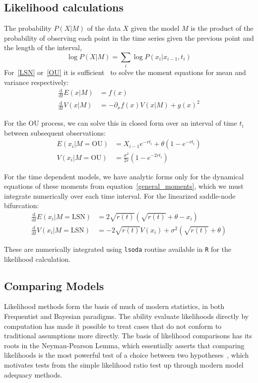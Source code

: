 \documentclass[authoryear,review,11pt]{elsarticle}
\newcommand{\ud}{\mathrm{d}}
\begin{document}
\subsection*{Likelihood calculations}
The probability $P(X|M)$ of the data $X$ given the model $M$ is the product of the probability of observing each point in the time series given the previous point and the length of the interval,  
\begin{equation}
\log P(X | M)=  \sum_i \log P(x_i | x_{i-1}, t_i)
\end{equation}
For~\eqref{LSN} or~\eqref{OU} it is sufficient~\citep{Gardiner2009} to solve the moment equations for mean and variance respectively:
\begin{align}
 \frac{\ud }{\ud t} E(x| M)&=  f(x) \\
\frac{\ud}{\ud t} V(x| M) &=  -\partial_x f(x) V(x|M) + g(x)^2 
  \label{general_moments}
\end{align}

For the OU process, we can solve this in closed form over an interval of time $t_i$ between subsequent observations: 
\begin{align}
  E(x_i| M = \text{OU}) &= X_{i-1} e^{-r t_i} + \theta \left(1 - e^{-rt_i} \right) \\
V(x_i| M = \text{OU}) &= \frac{\sigma^2}{2 r} \left(1 - e^{-2 r t_i} \right)
\label{OUsoln}
\end{align}

For the time dependent models, we have analytic forms only for the dynamical equations of these moments from equation~\eqref{general_moments}, which we must integrate numerically over each time interval. For the linearized saddle-node bifurcation:
\begin{align}
\frac{\ud }{\ud t} E(x_i| M = \text{LSN})&=  2\sqrt{r(t)}(\sqrt{r(t)}+\theta - x_i) \\
\frac{\ud}{\ud t} V(x_i| M = \text{LSN}) &=  -2 \sqrt{r(t)} V(x_i) + \sigma^2 ( \sqrt{r(t)}+\theta )
\label{LSNsoln}
\end{align}

These are numerically integrated using \texttt{lsoda} routine available in \texttt{R} for the likelihood calculation.  

\subsection*{Comparing Models}
Likelihood methods form the basis of much of modern statistics, in both Frequentist and Bayesian paradigms.  
The ability evaluate likelihoods directly by computation has made it possible to treat cases that do not conform to traditional assumptions more directly.
The basis of likelihood comparisons has its roots in the Neyman-Pearson Lemma, 
which essentially asserts that comparing likelihoods is the most powerful test
of a choice between two hypotheses~\citep{Neyman1933}, which motivates
tests from the simple likelihood ratio test up through modern model adequacy methods.
\end{document}
